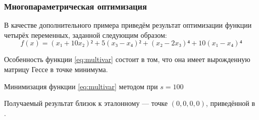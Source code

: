 \subsubsection{Многопараметрическая оптимизация}

В качестве дополнительного примера приведём результат оптимизации
функции четырёх переменных, заданной следующим образом:
\begin{equation}
  \label{eq:multivar}
  f(x) = (x₁ + 10x₂)² + 5(x₃ - x₄)² + (x₂-2x₃)⁴+10(x₁-x₄)⁴
\end{equation}

Особенность функции \eqref{eq:multivar} состоит в том, что она имеет
вырожденную матрицу Гессе в точке минимума.

\begin{table}[h]
  \centering
  
  \caption[\relch{} на функции четырёх переменных]{Минимизация функции \eqref{eq:multivar} методом \relch{} при $s=100$}
  \label{tab:multivar}
\end{table}

Получаемый результат близок к эталонному — точке $(0,0,0,0)$,
приведённой в \cite{himmelblau75}.
